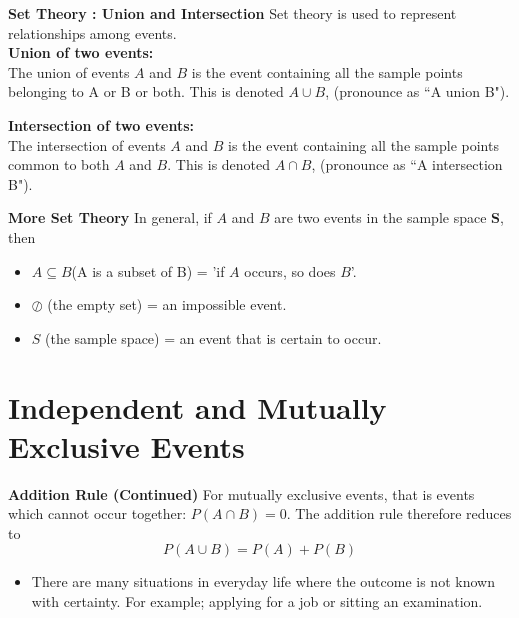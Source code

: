 \documentclass[]{report}
\begin{document}
{{{{{%

{

\textbf{Set Theory : Union and Intersection}
Set theory is used to represent relationships among events.\\ \bigskip
\textbf{Union of two events: }\\
The union of events $A$ and $B$ is the event containing all the sample points belonging to A or B or both.
This is denoted $A \cup B$, (pronounce as ``A union B").\\ \bigskip

\textbf{Intersection of two events:  }\\
The intersection of events $A$ and $B$ is the event containing all the sample points common to both $A$ and $B$. This is denoted
$A \cap B$, (pronounce as ``A intersection B").


}


{
\textbf{More Set Theory}
In general, if $A$ and $B$ are two events in the sample space $\boldsymbol{S}$, then
\begin{itemize}
\item  $A \subseteq B$(A is a subset of B) = 'if $A$ occurs, so does $B$'.\\
\item  $\boldsymbol{\oslash}$ (the empty set) = an impossible event.\\
\item  $S$ (the sample space) = an event that is certain to occur.\\
\end{itemize}
}



\section{Independent and Mutually Exclusive Events}
{

 
\textbf{Addition Rule (Continued)}
For mutually exclusive events, that is events which cannot occur together:
$P(A \cap B) = 0$. The addition rule therefore reduces to
\[ P(A \cup B) = P(A) + P(B) \]



{ 
\begin{itemize}
\item There are many situations in everyday life where the outcome is not known with certainty. For example; applying for a job or sitting an examination.


\end{itemize}}}}}}}}
\end{document}
